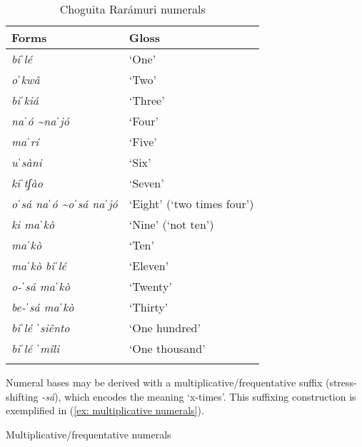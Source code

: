 \begin{table}
\caption{Choguita Rarámuri numerals}
\label{tab:numerals}

\begin{tabularx}{.6\textwidth}{ll}
\lsptoprule
\textbf{Forms}  & \textbf{Gloss} \\
\midrule
\textit{biˈlé} & `One'\\
\textit{oˈkwâ} & `Two'\\
\textit{biˈkiá} & `Three'\\
\textit{naˈó \textasciitilde naˈjó} & `Four'\\
\textit{maˈrí} & `Five'\\
\textit{uˈsàni} & `Six'\\
\textit{kiˈtʃào} & `Seven'\\
\textit{oˈsá naˈó \textasciitilde oˈsá naˈjó}  & `Eight' (`two times four') \\
\textit{ki maˈkò} & `Nine' (`not ten')\\
\textit{maˈkò} & `Ten'\\
\textit{maˈkò biˈlé} & `Eleven'\\
\textit{o-ˈsá maˈkò} & `Twenty'\\
\textit{be-ˈsá maˈkò} & `Thirty'\\
\textit{biˈlé ˈsiênto} & `One hundred'\\
\textit{biˈlé ˈmîli} & `One thousand'\\
\lspbottomrule
\end{tabularx}
\end{table}


\hspace*{-2.8pt}Numeral bases may be derived with a multiplicative/frequentative suffix (stress-shifting \textit{-sá}), which encodes the meaning `x-times'. This suffixing construction is exemplified in (\ref{ex: multiplicative numerals}).

\largerpage
\ea\label{ex: multiplicative numerals}
{Multiplicative/frequentative numerals}

